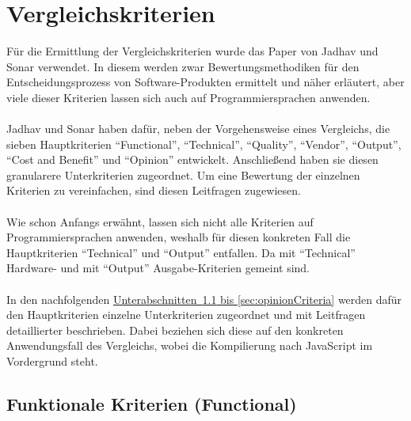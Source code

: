 \section{Vergleichskriterien}\label{sec:comparisonCriteria}
Für die Ermittlung der Vergleichskriterien wurde das Paper \cite{frameworkEvaluation} von Jadhav und Sonar verwendet. In diesem werden zwar Bewertungsmethodiken für den Entscheidungsprozess von Software-Produkten ermittelt und näher erläutert, aber viele dieser Kriterien lassen sich auch auf Programmiersprachen anwenden. \\
\\
Jadhav und Sonar haben dafür, neben der Vorgehensweise eines Vergleichs, die sieben Hauptkriterien \enquote{Functional}, \enquote{Technical}, \enquote{Quality}, \enquote{Vendor}, \enquote{Output}, \enquote{Cost and Benefit} und \enquote{Opinion} entwickelt. Anschließend haben sie diesen granularere Unterkriterien zugeordnet. Um eine Bewertung der einzelnen Kriterien zu vereinfachen, sind diesen Leitfragen zugewiesen.\\
\\
Wie schon Anfangs erwähnt, lassen sich nicht alle Kriterien auf Programmiersprachen anwenden, weshalb für diesen konkreten Fall die Hauptkriterien \enquote{Technical} und \enquote{Output} entfallen. Da mit \enquote{Technical} Hardware- und mit \enquote{Output} Ausgabe-Kriterien gemeint sind.\\
\\
In den nachfolgenden \hyperref[sec:functionalCriteria, sec:opinionCriteria]{Unterabschnitten~\ref{sec:functionalCriteria} bis \ref{sec:opinionCriteria}} werden dafür den Hauptkriterien einzelne Unterkriterien zugeordnet und mit Leitfragen detaillierter beschrieben. Dabei beziehen sich diese auf den konkreten Anwendungsfall des Vergleichs, wobei die Kompilierung nach JavaScript im Vordergrund steht.
 
\subsection{Funktionale Kriterien (Functional)}\label{sec:functionalCriteria}
